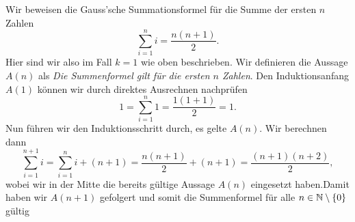 \begin{example}{}{}



Wir beweisen die Gauss’sche Summationsformel für die Summe der ersten \(n\) Zahlen
\begin{equation*}
  \sum_{i=1}^n i = \frac{n(n+1)}2.
\end{equation*}
Hier sind wir also im Fall \(k=1\) wie oben beschrieben. Wir definieren die Aussage \(A(n)\) als \emph{Die Summenformel gilt für die ersten \(n\) Zahlen}.
Den Induktionsanfang \(A(1)\) können wir durch direktes Ausrechnen nachprüfen
\begin{equation*}
  1 = \sum_{i=1}^n 1 = \frac{1(1+1)}2 = 1.
\end{equation*}
Nun führen wir den Induktionsschritt durch, es gelte \(A(n)\). Wir berechnen dann
\begin{equation*}
 \sum_{i=1}^{n+1} i = \sum_{i=1}^n i  + (n+1) = \frac{n(n+1)}2 + (n+1) = \frac{(n+1)(n+2)}2,
\end{equation*}
wobei wir in der Mitte die bereits gültige Aussage \(A(n)\)  eingesetzt haben.Damit haben wir \(A(n+1)\) gefolgert und somit die Summenformel für alle \(n \in \mathbb{N} \setminus \{0\}\) gültig
\end{example}


